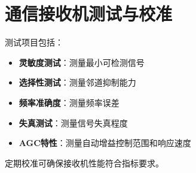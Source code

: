\section{通信接收机测试与校准}
\label{sec:comm_receiver_testing}

测试项目包括：

\begin{itemize}
    \item \textbf{灵敏度测试}：测量最小可检测信号
    \item \textbf{选择性测试}：测量邻道抑制能力
    \item \textbf{频率准确度}：测量频率误差
    \item \textbf{失真测试}：测量信号失真程度
    \item \textbf{AGC特性}：测量自动增益控制范围和响应速度
\end{itemize}

定期校准可确保接收机性能符合指标要求。
